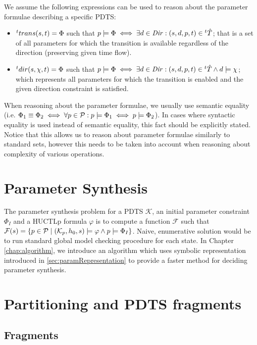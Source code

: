 We assume the following expressions can be used to reason about the parameter formulae describing a specific \ac{PDTS}:

\begin{itemize}
	\item ${}^{t}trans(s,t) = \Phi$ such that $p \models \Phi \iff \exists d \in \mathit{Dir} : (s, d, p, t) \in {}^{t}\hat{T}$; that is a set of all parameters for which the transition is available regardless of the direction (preserving given time flow).
	\item ${}^{t}dir(s, \chi ,t) = \Phi$ such that $p \models \Phi \iff \exists d \in \mathit{Dir} : (s, d, p, t) \in {}^{t}\hat{T} \land d \models \chi$; which represents all parameters for which the transition is enabled and the given direction constraint is satisfied.
\end{itemize}

When reasoning about the parameter formulae, we usually use semantic equality (i.e. $\Phi_1 \equiv \Phi_2 \iff \forall p \in \mathcal{P} : p \models \Phi_1 \iff p \models \Phi_2$). In cases where syntactic equality is used instead of semantic equality, this fact should be explicitly stated. Notice that this allows us to reason about parameter formulae similarly to standard sets, however this needs to be taken into account when reasoning about complexity of various operations.

\section{Parameter Synthesis}

The parameter synthesis problem for a \ac{PDTS} $\mathcal{K}$, an initial parameter constraint $\Phi_I$ and a \ac{HUCTLp} formula $\varphi$ is to compute a function $\mathcal{F}$ such that $\mathcal{F}(s) = \{p \in \mathcal{P} \mid (\mathcal{K}_p, h_0, s) \models \varphi \land p \models \Phi_I \}$. Naive, enumerative solution would be to run standard global model checking procedure for each state. In Chapter \ref{chap:algorithm}, we introduce an algorithm which uses symbolic representation introduced in \ref{sec:paramRepresentation} to provide a faster method for deciding parameter synthesis.

\section{Partitioning and \ac{PDTS} fragments}

\subsection{Fragments}

